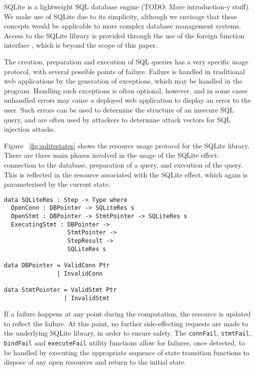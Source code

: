 \documentclass[preprint]{sigplanconf}
\begin{document}
SQLite is a lightweight SQL database engine \cite{sqlite} (TODO: More introduction-y stuff). We make use of SQLite due to its simplicity, although we envisage that these concepts would be applicable to more complex database management systems. Access to the SQLite library is provided through the use of the \idris{} foreign function interface \cite{ffi}, which is beyond the scope of this paper.

The creation, preparation and execution of SQL queries has a very specific usage protocol, with several possible points of failure. Failure is handled in traditional web applications by the generation of exceptions, which may be handled in the program.
Handling such exceptions is often optional, however, and in some cases unhandled errors may cause a deployed web application to display an error to the user. Such errors can be used to determine the structure of an insecure SQL query, and are often used by attackers to determine attack vectors for SQL injection attacks.

Figure ~\ref{fig:sqlitestates} shows the resource usage protocol for the SQLite library. There are three main phases involved in the usage of the SQLite effect: connection to the database, preparation of a query, and execution of the query. This is reflected in the resource associated with the SQLite effect, which again is parameterised by the current state.
{\small
\begin{verbatim}
data SQLiteRes : Step -> Type where
  OpenConn : DBPointer -> SQLiteRes s
  OpenStmt : DBPointer -> StmtPointer -> SQLiteRes s
  ExecutingStmt : DBPointer -> 
                  StmtPointer -> 
                  StepResult -> 
                  SQLiteRes s
                  
data DBPointer = ValidConn Ptr
               | InvalidConn

data StmtPointer = ValidStmt Ptr
                 | InvalidStmt 
\end{verbatim}
}
If a failure happens at any point during the computation, the resource is updated to reflect the failure. At this point, no further side-effecting requests are made to the underlying SQLite library, in order to ensure safety. The \texttt{connFail}, \texttt{stmtFail}, \texttt{bindFail} and \texttt{executeFail} utility functions allow for failures, once detected, to be handled by executing the appropriate sequence of state transition functions to dispose of any open resources and return to the initial state. 
\end{document}
